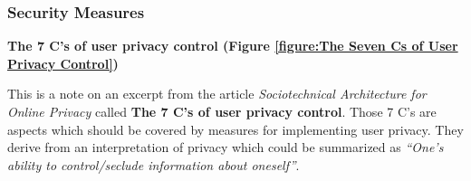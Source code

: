 \subsubsection{Security Measures}

\textbf{The 7 C's of user privacy control (Figure \ref{figure:The Seven Cs of User Privacy Control})}

This is a note on an excerpt from the article \emph{Sociotechnical
Architecture for Online Privacy} \cite{1} called
\textbf{The 7 C's of user privacy control}. Those 7 C's are aspects
which should be covered by measures for implementing user privacy. They
derive from an interpretation of privacy which could be summarized as
\emph{``One's ability to control/seclude information about oneself''}.



